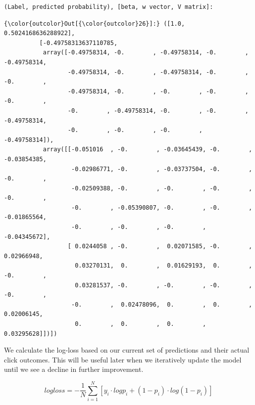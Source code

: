 \documentclass[11pt]{article}
\begin{document}
    \begin{Verbatim}[commandchars=\\\{\}]
(Label, predicted probability), [beta, w vector, V matrix]:

    \end{Verbatim}

\begin{Verbatim}[commandchars=\\\{\}]
{\color{outcolor}Out[{\color{outcolor}26}]:} ([1.0, 0.5024168636288922],
          [-0.49758313637110785,
           array([-0.49758314, -0.        , -0.49758314, -0.        , -0.49758314,
                  -0.49758314, -0.        , -0.49758314, -0.        , -0.        ,
                  -0.49758314, -0.        , -0.        , -0.        , -0.        ,
                  -0.        , -0.49758314, -0.        , -0.        , -0.49758314,
                  -0.        , -0.        , -0.        , -0.49758314]),
           array([[-0.051016  , -0.        , -0.03645439, -0.        , -0.03854385,
                   -0.02986771, -0.        , -0.03737504, -0.        , -0.        ,
                   -0.02509388, -0.        , -0.        , -0.        , -0.        ,
                   -0.        , -0.05390807, -0.        , -0.        , -0.01865564,
                   -0.        , -0.        , -0.        , -0.04345672],
                  [ 0.0244058 , -0.        ,  0.02071585, -0.        ,  0.02966948,
                    0.03270131,  0.        ,  0.01629193,  0.        , -0.        ,
                    0.03281537, -0.        , -0.        , -0.        , -0.        ,
                   -0.        ,  0.02478096,  0.        ,  0.        ,  0.02006145,
                    0.        ,  0.        ,  0.        ,  0.03295628]])])
\end{Verbatim}
            
    We calculate the log-loss based on our current set of predictions and
their actual click outcomes. This will be useful later when we
iteratively update the model until we see a decline in further
improvement.

    \[logloss = -\frac{1}{N}\sum_{i=1}^{N}[y_i\cdot log p_i + (1-p_i)\cdot log(1-p_i)]\]
\end{document}

